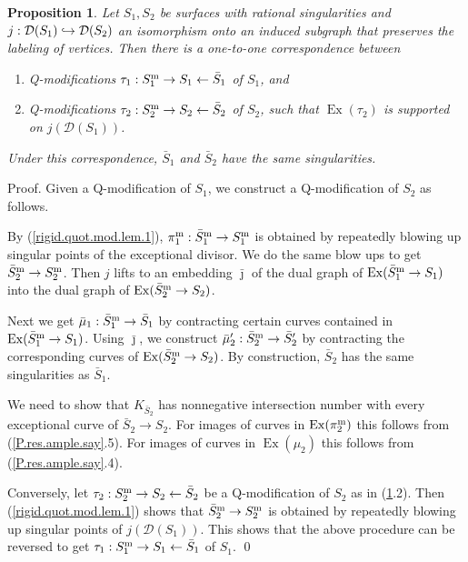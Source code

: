 \documentclass{amsart}
\newtheorem{prop}[thm]{Proposition}
\theoremstyle{definition}
\theoremstyle{remark}
\newcommand{\ex}[0]{\operatorname{Ex}}
\def\into{\DOTSB\lhook\joinrel\to}
\begin{document}
  
\begin{prop}
  \label{Pmod.extends.prop}
  Let $S_1, S_2$ be surfaces with rational singularities
  and $j: {\mathcal D}(S_1)\into {\mathcal D}(S_2)$ an
isomorphism onto an induced 
subgraph that preserves the labeling of vertices.
Then there is a one-to-one correspondence between
    \begin{enumerate}
      \item Q-modifications $\tau_1: S_1^{\rm m}\to S_1\leftarrow  \bar S_1$ of $S_1$, and
      \item Q-modifications  $\tau_2: S_2^{\rm m}\to S_2\leftarrow \bar S_2$ of $S_2$,  such that $\ex(\tau_2)$ is  supported on
        $j( {\mathcal D}(S_1))$.
    \end{enumerate}
    Under this correspondence, $\bar S_1$ and $\bar S_2$ have the same singularities.
\end{prop}





Proof. Given a Q-modification  of $S_1$, we construct  a Q-modification  of $S_2$ as follows.

By (\ref{rigid.quot.mod.lem.1}),  $\pi_1^{\rm m}: \bar S_1^{\rm m}\to S_1^{\rm m}$ is obtained by repeatedly blowing up singular points of the exceptional divisor. We do the same blow ups to
get $\bar S_2^{\rm m}\to S_2^{\rm m}$. Then $j$ lifts to an
embedding $\bar{\jmath}$ of the dual graph of $\ex(\bar S_1^{\rm m}\to S_1)$
into the dual graph of $\ex(\bar S_2^{\rm m}\to S_2)$.

Next we get $\bar\mu_1: \bar S_1^{\rm m}\to \bar S_1$ 
by contracting certain
curves contained in
$\ex(\bar S_1^{\rm m}\to S_1)$.
Using $\bar{\jmath}$, we construct
$\bar\mu'_2: \bar S_2^{\rm m}\to \bar S'_2$
by contracting the  corresponding
curves of $\ex(\bar S_2^{\rm m}\to S_2)$.
By construction, $\bar S_2$ has the same singularities as $\bar S_1$.

We need  to show that $K_{\bar S_2}$ has nonnegative intersection number with
every exceptional curve of $\bar S_2\to S_2$.
For images of curves in $\ex(\pi_2^{\rm m})$ this follows from (\ref{P.res.ample.say}.5). For images of curves in $\ex(\mu_2)$ this follows from (\ref{P.res.ample.say}.4).

Conversely, let  $\tau_2: S_2^{\rm m}\to S_2\leftarrow \bar S_2$  be a  Q-modification of $S_2$ as in (\ref{Pmod.extends.prop}.2).
Then 
(\ref{rigid.quot.mod.lem.1}) shows that
$\bar S_2^{\rm m}\to S_2^{\rm m}$ is obtained by repeatedly blowing up
singular points of $j( {\mathcal D}(S_1))$. This shows that the above procedure can be reversed to get $\tau_1: S_1^{\rm m}\to S_1\leftarrow  \bar S_1$ of $S_1$.
\qed
\end{document}
